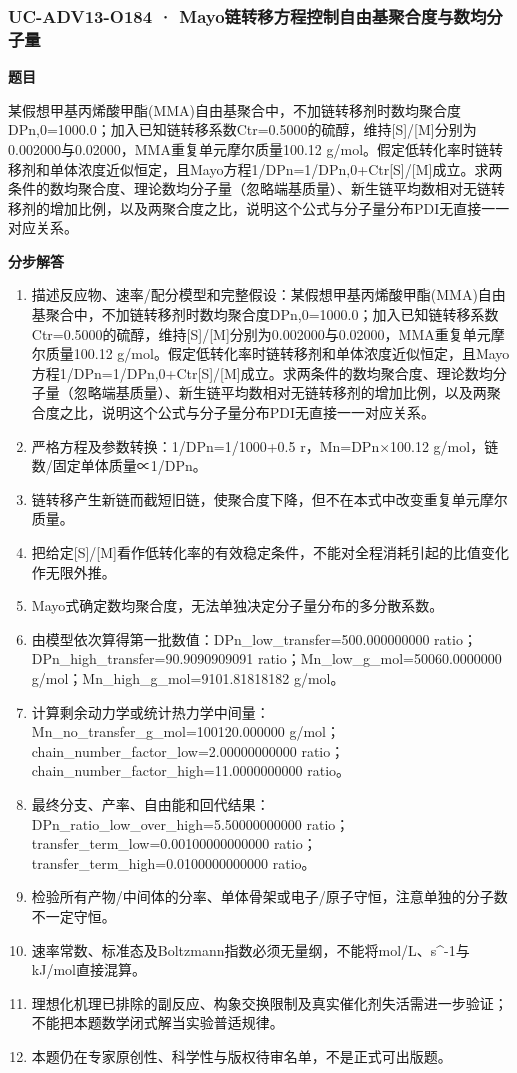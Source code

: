 \documentclass[UTF8,11pt,a4paper]{ctexart}
\begin{document}
\subsubsection*{UC-ADV13-O184 · Mayo链转移方程控制自由基聚合度与数均分子量}
\noindent\textbf{题目}\par
某假想甲基丙烯酸甲酯(MMA)自由基聚合中，不加链转移剂时数均聚合度DPn,0=1000.0；加入已知链转移系数Ctr=0.5000的硫醇，维持[S]/[M]分别为0.002000与0.02000，MMA重复单元摩尔质量100.12 g/mol。假定低转化率时链转移剂和单体浓度近似恒定，且Mayo方程1/DPn=1/DPn,0+Ctr[S]/[M]成立。求两条件的数均聚合度、理论数均分子量（忽略端基质量）、新生链平均数相对无链转移剂的增加比例，以及两聚合度之比，说明这个公式与分子量分布PDI无直接一一对应关系。\par
\medskip\noindent\textbf{分步解答}
\begin{enumerate}
\item 描述反应物、速率/配分模型和完整假设：某假想甲基丙烯酸甲酯(MMA)自由基聚合中，不加链转移剂时数均聚合度DPn,0=1000.0；加入已知链转移系数Ctr=0.5000的硫醇，维持[S]/[M]分别为0.002000与0.02000，MMA重复单元摩尔质量100.12 g/mol。假定低转化率时链转移剂和单体浓度近似恒定，且Mayo方程1/DPn=1/DPn,0+Ctr[S]/[M]成立。求两条件的数均聚合度、理论数均分子量（忽略端基质量）、新生链平均数相对无链转移剂的增加比例，以及两聚合度之比，说明这个公式与分子量分布PDI无直接一一对应关系。
\item 严格方程及参数转换：1/DPn=1/1000+0.5 r，Mn=DPn×100.12 g/mol，链数/固定单体质量∝1/DPn。
\item 链转移产生新链而截短旧链，使聚合度下降，但不在本式中改变重复单元摩尔质量。
\item 把给定[S]/[M]看作低转化率的有效稳定条件，不能对全程消耗引起的比值变化作无限外推。
\item Mayo式确定数均聚合度，无法单独决定分子量分布的多分散系数。
\item 由模型依次算得第一批数值：DPn\_low\_transfer=500.000000000 ratio；DPn\_high\_transfer=90.9090909091 ratio；Mn\_low\_g\_mol=50060.0000000 g/mol；Mn\_high\_g\_mol=9101.81818182 g/mol。
\item 计算剩余动力学或统计热力学中间量：Mn\_no\_transfer\_g\_mol=100120.000000 g/mol；chain\_number\_factor\_low=2.00000000000 ratio；chain\_number\_factor\_high=11.0000000000 ratio。
\item 最终分支、产率、自由能和回代结果：DPn\_ratio\_low\_over\_high=5.50000000000 ratio；transfer\_term\_low=0.00100000000000 ratio；transfer\_term\_high=0.0100000000000 ratio。
\item 检验所有产物/中间体的分率、单体骨架或电子/原子守恒，注意单独的分子数不一定守恒。
\item 速率常数、标准态及Boltzmann指数必须无量纲，不能将mol/L、s\textasciicircum{}-1与kJ/mol直接混算。
\item 理想化机理已排除的副反应、构象交换限制及真实催化剂失活需进一步验证；不能把本题数学闭式解当实验普适规律。
\item 本题仍在专家原创性、科学性与版权待审名单，不是正式可出版题。
\end{enumerate}
\end{document}
